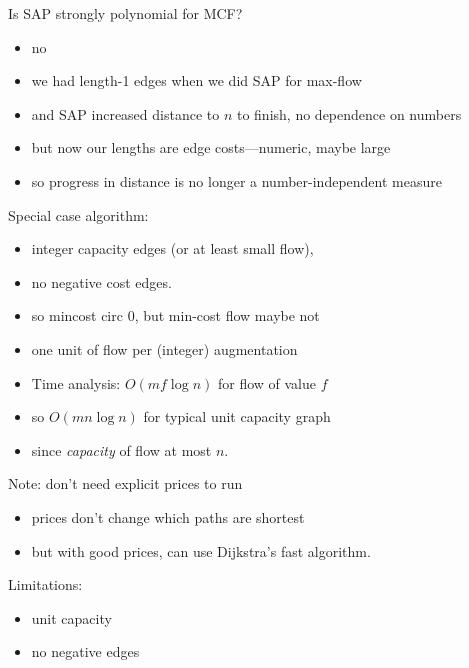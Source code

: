 \documentclass{article}
\begin{document}
Is SAP strongly polynomial for MCF?
\begin{itemize}
\item no
\item we had length-1 edges when we did SAP for max-flow
\item and SAP increased distance to $n$ to finish, no dependence on numbers
\item but now our lengths are edge costs---numeric, maybe large
\item so progress in distance is no longer a number-independent measure
\end{itemize}

Special case algorithm:
\begin{itemize}
\item integer capacity edges (or at least small flow),
\item no negative cost edges.
\item so mincost circ 0, but min-cost flow maybe not
\item one unit of flow per (integer) augmentation
\item Time analysis: $O(mf\log n)$ for flow of value $f$
\item so $O(mn\log n)$ for typical unit capacity graph
\item since {\em capacity} of flow at most $n$.
\end{itemize}

Note: don't need explicit prices to run
\begin{itemize}
\item prices don't change which paths are shortest
\item but with good prices, can use Dijkstra's fast algorithm.
\end{itemize}

Limitations:
\begin{itemize}
\item unit capacity
\item no negative edges
\end{itemize}
\end{document}
